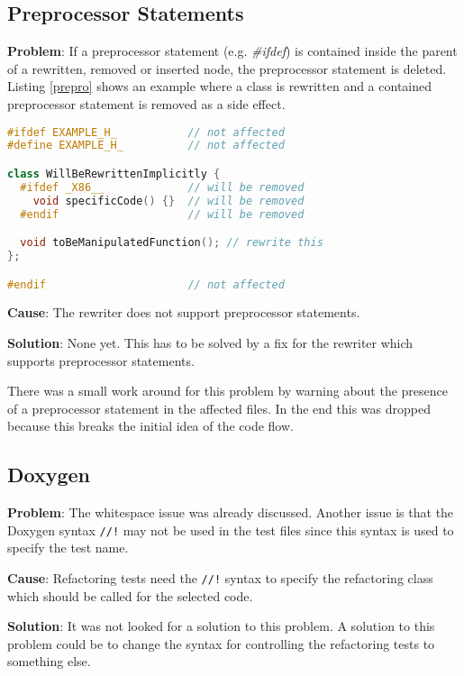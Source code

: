 \subsection{Preprocessor Statements}
\label{preprocessor}
\textbf{Problem}: If a preprocessor statement (e.g. \textit{\#ifdef}) is
contained inside the parent of a rewritten, removed or inserted node, the
preprocessor statement is deleted. Listing \ref{prepro} shows an example where a
class is rewritten and a contained preprocessor statement is removed as a side
effect.

\begin{lstlisting}[caption={Jeopardized preprocessor statement inside a class},
label={prepro}, language=C++]
#ifdef EXAMPLE_H_           // not affected
#define EXAMPLE_H_          // not affected

class WillBeRewrittenImplicitly {
  #ifdef _X86__             // will be removed
    void specificCode() {}  // will be removed
  #endif                    // will be removed

  void toBeManipulatedFunction(); // rewrite this
};

#endif                      // not affected
\end{lstlisting}

\textbf{Cause}: The rewriter does not support preprocessor statements.

\textbf{Solution}: None yet. This has to be solved by a fix for the rewriter
which supports preprocessor statements.

There was a small work around for this problem by warning about the presence of
a preprocessor statement in the affected files. In the end this was dropped
because this breaks the initial idea of the code flow.

\subsection{Doxygen}

\textbf{Problem}: The whitespace issue was already discussed. Another issue is
that the Doxygen \cite{Doxygen} syntax \texttt{//!} may not be used in the test
files since this syntax is used to specify the test name.

\textbf{Cause}: Refactoring tests need the \texttt{//!} syntax to specify the
refactoring class which should be called for the selected code.

\textbf{Solution}: It was not looked for a solution to this problem. A solution
to this problem could be to change the syntax for controlling the refactoring
tests to something else.

